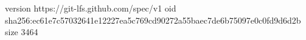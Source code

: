 version https://git-lfs.github.com/spec/v1
oid sha256:ec61e7c57032641e12227ea5c769cd90272a55baec7de6b75097e0c0fd9d6d2b
size 3464

